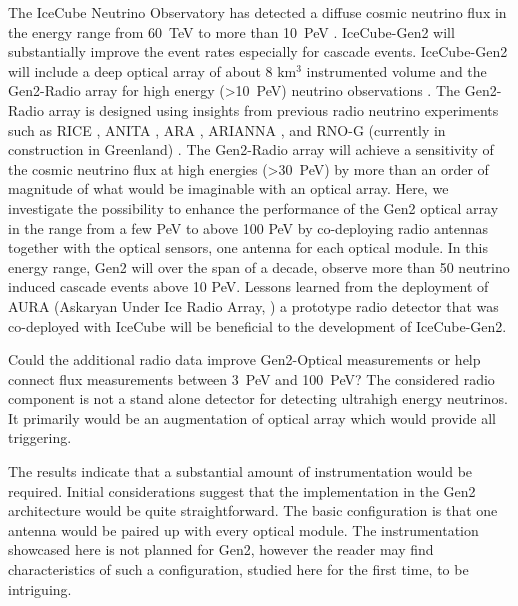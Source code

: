   The IceCube Neutrino Observatory has detected a diffuse cosmic neutrino flux in the energy range from 60~TeV to more than 10~PeV \citep{icecube_search_2013,icecube_search_2016tracks,icecube_search_2020cascades,icecube_search_glashow, icecube_search-ehe}.  
  IceCube-Gen2 will substantially improve the event rates especially for cascade events. 
  IceCube-Gen2 will include a deep optical array of about 8 km$^3$ instrumented volume and the Gen2-Radio array for high energy (>10~PeV) neutrino observations \citep{icecube_gen2}. 
  The Gen2-Radio array is designed using insights from previous radio neutrino experiments such as RICE \citep{rice}, ANITA \citep{anita_iv}, ARA \citep{ara_design, ara_a23}, ARIANNA \citep{arianna_testbed, arianna_pilot}, and \mbox{RNO-G} (currently in construction in Greenland) \citep{rnog_design}.
  The Gen2-Radio array will achieve a sensitivity of the cosmic neutrino flux at high energies (>30~PeV) by more than an order of magnitude of what would be imaginable with an optical array.  
  Here, we investigate the possibility to enhance the performance of 
  the Gen2 optical array in the range from a few PeV to above 100 PeV
  by co-deploying radio antennas together with the optical sensors, one antenna 
  for each optical module.  
  In this energy range, Gen2 will over the span of a decade, observe more than 50 neutrino induced cascade events  above 10 PeV. 
  Lessons learned from the deployment of AURA
  (Askaryan Under Ice Radio Array, \citep{aura}) a prototype radio detector 
  that was co-deployed with IceCube will be beneficial to the development of IceCube-Gen2.

  Could the additional radio data improve Gen2-Optical measurements or help connect flux measurements between 3~PeV and 100~PeV?  
  The considered radio component is not a stand alone detector for detecting ultrahigh energy neutrinos.  It primarily would be an augmentation of optical array
  which would provide all triggering.  

  The results indicate that a substantial amount of instrumentation would be required. Initial considerations suggest that the implementation in the Gen2 architecture would be quite straightforward.  The basic configuration is that
  one antenna would be paired up with every optical module.  
  The instrumentation showcased here is not planned for Gen2, however the reader may find characteristics of such a configuration, 
  studied here for the first time, to be intriguing.  

